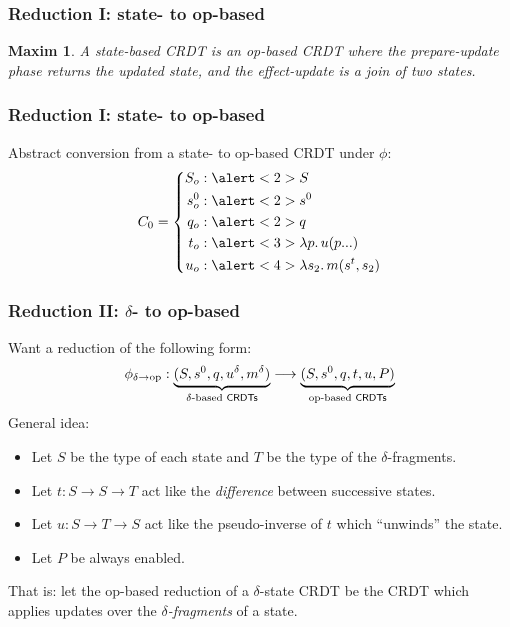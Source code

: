 \documentclass[aspectratio=169,compress,handout]{beamer}
\newcommand*{\CRDT}{\textsf{CRDT}\xspace}
\newcommand*{\CRDTs}{\textsf{CRDTs}\xspace}
\newtheorem{maxim}{Maxim}[theorem]
\begin{document}
  \begin{frame}
    \frametitle{Reduction I: state- to op-based}
    \begin{maxim}
      A state-based \CRDT is an op-based \CRDT where the \emph{prepare-update}
      phase returns the updated state, and the \emph{effect-update} is a join of
      two states.
    \end{maxim}
  \end{frame}

  \begin{frame}
    \frametitle{Reduction I: state- to op-based}
    Abstract conversion from a state- to op-based \CRDT under $\phi$:
    \[
      C_0 = \left\{ \begin{aligned}
        S_o &: \alert<2>{S} \\
        s^0_o &: \alert<2>{s^0} \\
        q_o &: \alert<2>{q} \\
        t_o &: \alert<3>{\lambda p.\, u(p...)} \\
        u_o &: \alert<4>{\lambda s_2.\, m(s^t, s_2)} \\
      \end{aligned} \right.
    \]
    \pause
  \end{frame}

  \begin{frame}
    \frametitle{Reduction II: $\delta$- to op-based}
    Want a reduction of the following form:
    \[
      \phi_{\delta \to \text{op}} :
        \underbrace{(S, s^0, q, u^\delta, m^\delta)}_{\text{$\delta$-based \CRDTs}}
        \longrightarrow
        \underbrace{(S, s^0, q, t, u, P)}_{\text{op-based \CRDTs}}
    \]
    \pause
    General idea:
    \begin{itemize}[<+->]
      \item Let $S$ be the type of each state and $T$ be the type of the
        $\delta$-fragments.
      \item Let $t : S \to S \to T$ act like the \emph{difference} between
        successive states.
      \item Let $u : S \to T \to S$ act like the pseudo-inverse of $t$ which
        ``unwinds'' the state.
      \item Let $P$ be always enabled.
    \end{itemize}
    \pause
    That is: let the op-based reduction of a $\delta$-state \CRDT be the \CRDT
    which applies updates over the \emph{$\delta$-fragments} of a state.
  \end{frame}
\end{document}
